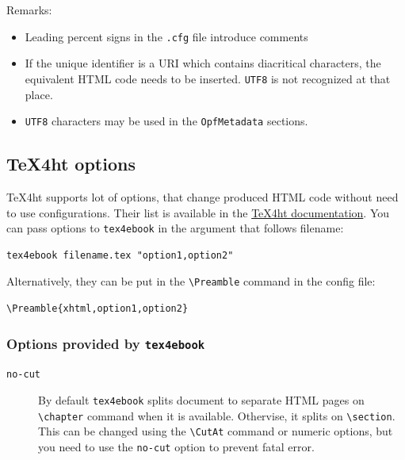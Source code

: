 Remarks:

\begin{itemize}
\tightlist
\item
  Leading percent signs in the \texttt{.cfg} file introduce comments
\item
  If the unique identifier is a URI which contains diacritical
  characters, the\\
  equivalent HTML code needs to be inserted. \texttt{UTF8} is not
  recognized at that place.
\item
  \texttt{UTF8} characters may be used in the \texttt{OpfMetadata}
  sections.
\end{itemize}

\subsection{\texorpdfstring{\TeX4ht
options}{4ht options}}\label{ht-options}

\TeX4ht supports lot of options, that change produced HTML code without
need to use configurations. Their list is available in the
\href{https://www.kodymirus.cz/tex4ht-doc/texfourhtOptions.html}{\TeX4ht
documentation}. You can pass options to \texttt{tex4ebook} in the
argument that follows filename:

\begin{verbatim}
tex4ebook filename.tex "option1,option2"
\end{verbatim}

Alternatively, they can be put in the \texttt{\textbackslash{}Preamble}
command in the config file:

\begin{verbatim}
\Preamble{xhtml,option1,option2}
\end{verbatim}

\subsubsection{\texorpdfstring{Options provided by
\texttt{tex4ebook}}{Options provided by tex4ebook}}\label{options-provided-by-tex4ebook}

\begin{description}
\item[\texttt{no-cut}]
By default \texttt{tex4ebook} splits document to separate HTML pages on
\texttt{\textbackslash{}chapter} command when it is available.
Othervise, it splits on \texttt{\textbackslash{}section}. This can be
changed using the \texttt{\textbackslash{}CutAt} command or numeric
options, but you need to use the \texttt{no-cut} option to prevent fatal
error.
\end{description}

